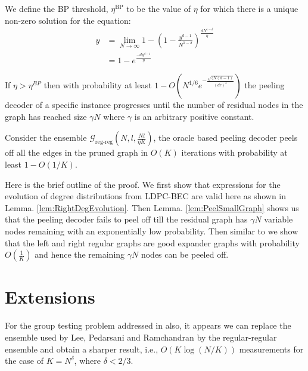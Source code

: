 \documentclass[journal,draft,onecolumn]{IEEEtran}
\begin{document}
\begin{definition}[BP Threshold]
We define the BP threshold, $\eta^{\text{BP}}$ to be the value of $\eta$ for which there is a unique non-zero solution for the equation:
\begin{align*}
y&=\lim_{N\rightarrow\infty}1-\left(1-\frac{y^{d-1}}{N^{1-\delta}}\right)^{\frac{dN^{1-\delta}}{\eta}}\\
  &=1-e^{\frac{-dy^{d-1}}{\eta}}
\end{align*}
\end{definition}

\begin{lemma}\label{lem:PeelSmallGraph}
If $\eta>\eta^{BP}$ then with probability at least $1-O\left(N^{1/6}e^{-\frac{\sqrt{(N(d-1)}}{(dr)^3}}\right)$ the peeling decoder of a specific instance progresses until the number of residual nodes in the graph has reached size $\gamma N$ where $\gamma$ is an arbitrary positive constant.
\end{lemma}

\begin{theorem}
Consider the ensemble $\mathcal{G}_{\text{reg-reg}}(N,l,\frac{Nl}{\eta K})$, the oracle based peeling decoder peels off all the edges in the pruned graph in $O(K)$ iterations with probability at least $1-O(1/K)$.
\end{theorem}
\begin{IEEEproof}
Here is the brief outline of the proof. We first show that expressions for the evolution of degree distributions from LDPC-BEC are valid here as shown in Lemma. \ref{lem:RightDegEvolution}. Then Lemma. \ref{lem:PeelSmallGraph} shows us that the peeling decoder fails to peel off till the residual graph has $\gamma N$ variable nodes remaining with an exponentially low probability. Then similar to \cite{li2015subisit} we show that the left and right regular graphs are good expander graphs with probability $O(\frac{1}{K})$ and hence the remaining $\gamma N$ nodes can be peeled off.
\end{IEEEproof}




\section{Extensions}  For the group testing problem addressed in \cite{lee2015saffron} also, it appears we can replace the ensemble used by Lee, Pedarsani and Ramchandran by the regular-regular ensemble and obtain a sharper result, i.e., $O(K \log (N/K))$ measurements for the case of $K = N^\delta$, where $\delta < 2/3$.
\end{document}
